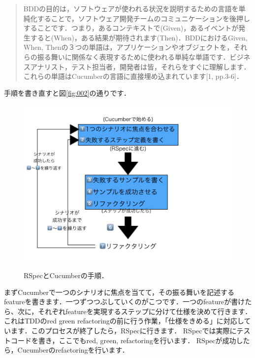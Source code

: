 \begin{quotation}
BDDの目的は，ソフトウェアが使われる状況を説明するための言語を単純化することで，ソフトウェア開発チームのコミュニケーションを後押しすることです．つまり，あるコンテキストで(Given)，あるイベントが発生すると(When)，ある結果が期待されます(Then)．BDDにおけるGiven, When, Thenの３つの単語は，アプリケーションやオブジェクトを，それらの振る舞いに関係なく表現するために使われる単純な単語です．ビジネスアナリスト，テスト担当者，開発者は皆，それらをすぐに理解します．これらの単語はCucumberの言語に直接埋め込まれています[1, pp.3-6]．

\end{quotation}
手順を書き直すと図\ref{fig:002}の通りです．

\begin{figure}[htbp]\begin{center}
\includegraphics[width=12cm,bb= 0 0 937 753]{../figs/./my_help_nasu.002.jpeg}
\caption{RSpecとCucumberの手順．}
\label{fig:002}
\label{default}\end{center}\end{figure}
まずCucumberで一つのシナリオに焦点を当てて，その振る舞いを記述するfeatureを書きます．一つずつつぶしていくのがこつです．一つのfeatureが書けたら、次に，それぞれfeatureを実現するステップに分けて仕様を決めて行きます．これはTDDのred green refactoringの前に行う作業，「仕様をきめる」に対応しています．このプロセスが終了したら，RSpecに行きます．
RSpecでは実際にテストコードを書き，ここでもred, green, refactoringを行います．
RSpecが成功したら，Cucumberのrefactoringを行います．

